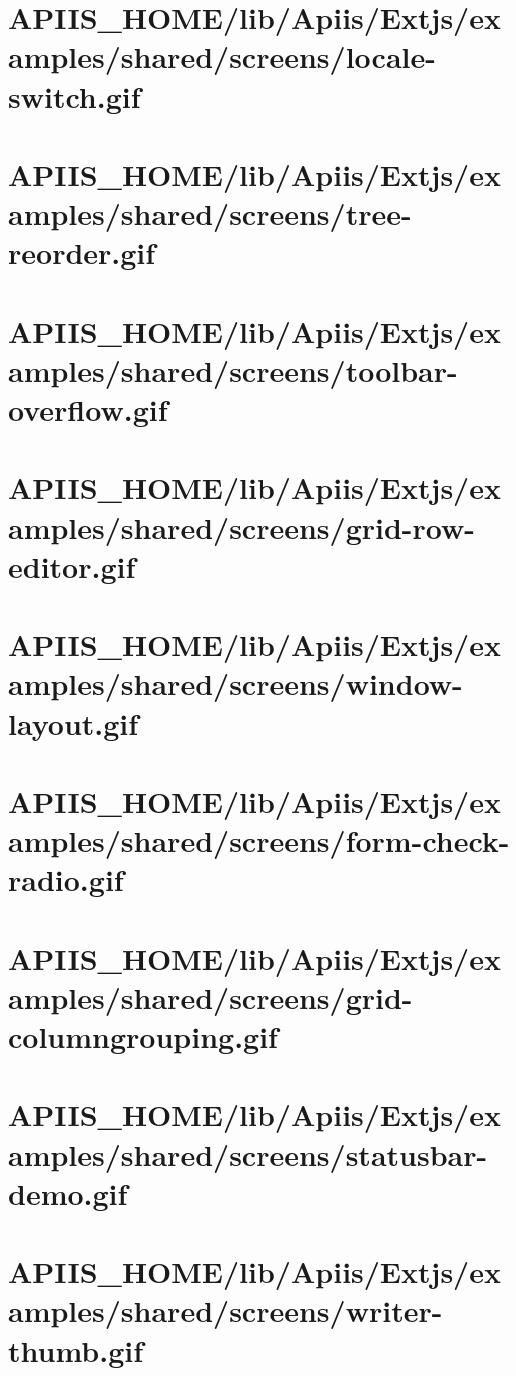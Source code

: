 \section{APIIS\_HOME/lib/Apiis/Extjs/examples/shared/screens/locale-switch.gif} 
\section{APIIS\_HOME/lib/Apiis/Extjs/examples/shared/screens/tree-reorder.gif} 
\section{APIIS\_HOME/lib/Apiis/Extjs/examples/shared/screens/toolbar-overflow.gif} 
\section{APIIS\_HOME/lib/Apiis/Extjs/examples/shared/screens/grid-row-editor.gif} 
\section{APIIS\_HOME/lib/Apiis/Extjs/examples/shared/screens/window-layout.gif} 
\section{APIIS\_HOME/lib/Apiis/Extjs/examples/shared/screens/form-check-radio.gif} 
\section{APIIS\_HOME/lib/Apiis/Extjs/examples/shared/screens/grid-columngrouping.gif} 
\section{APIIS\_HOME/lib/Apiis/Extjs/examples/shared/screens/statusbar-demo.gif} 
\section{APIIS\_HOME/lib/Apiis/Extjs/examples/shared/screens/writer-thumb.gif} 
